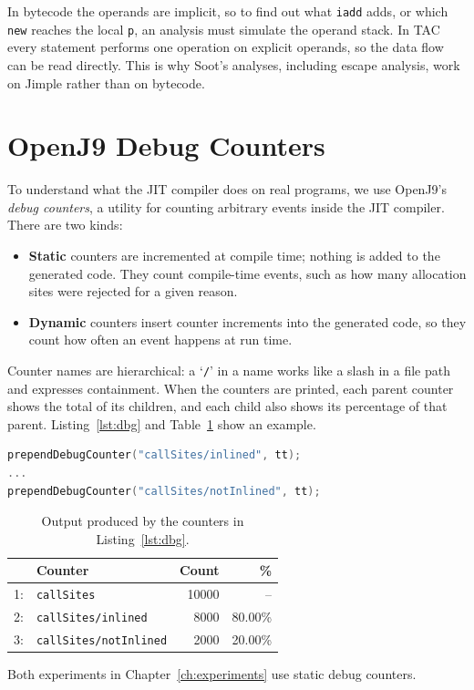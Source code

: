 In bytecode the operands are implicit, so to find out what \texttt{iadd} adds, or which
\texttt{new} reaches the local \texttt{p}, an analysis must simulate the operand stack. In TAC
every statement performs one operation on explicit operands, so the data flow can be read
directly. This is why Soot's analyses, including escape analysis, work on Jimple rather than on
bytecode.

\section{OpenJ9 Debug Counters}

To understand what the JIT compiler does on real programs, we use OpenJ9's \emph{debug counters},
a utility for counting arbitrary events inside the JIT compiler. There are two kinds:
\begin{itemize}
  \item \textbf{Static} counters are incremented at compile time; nothing is added to the
        generated code. They count compile-time events, such as how many allocation sites were
        rejected for a given reason.
  \item \textbf{Dynamic} counters insert counter increments into the generated code, so they
        count how often an event happens at run time.
\end{itemize}

Counter names are hierarchical: a `\texttt{/}' in a name works like a slash in a file path and
expresses containment. When the counters are printed, each parent counter shows the total of its
children, and each child also shows its percentage of that parent. Listing~\ref{lst:dbg} and
Table~\ref{tab:dbg} show an example.

\begin{lstlisting}[language=C++, caption={Counting inlined and non-inlined call sites.}, label={lst:dbg}]
prependDebugCounter("callSites/inlined", tt);
...
prependDebugCounter("callSites/notInlined", tt);
\end{lstlisting}

\begin{table}[htbp]
  \centering
  \begin{tabular}{@{}rlrr@{}}
    \toprule
    & Counter & Count & \% \\
    \midrule
    1: & \texttt{callSites}             & 10000 & -- \\
    2: & \texttt{callSites/inlined}     & 8000  & 80.00\% \\
    3: & \texttt{callSites/notInlined}  & 2000  & 20.00\% \\
    \bottomrule
  \end{tabular}
  \caption{Output produced by the counters in Listing~\ref{lst:dbg}.}
  \label{tab:dbg}
\end{table}

Both experiments in Chapter~\ref{ch:experiments} use static debug counters.
